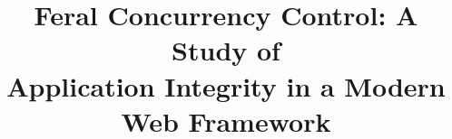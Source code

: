 \documentclass{sig-alternate}
\theoremstyle{definition}
\begin{document}
%

\title{Feral Concurrency Control: A Study of\\Application Integrity in
  a Modern Web Framework}

{\author{}}
\maketitle



















\scriptsize
\linespread{.98}
\selectfont

 

\linespread{1}
\normalsize
\selectfont



\balance
\end{document}
